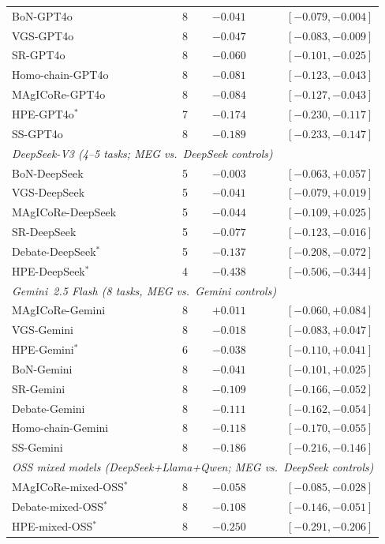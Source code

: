 \documentclass{article}
\begin{document}
\begin{table}[h]
\begin{tabular}{l r r r}
BoN-GPT4o & 8 & $-0.041$ & $[-0.079, -0.004]$ \\
VGS-GPT4o & 8 & $-0.047$ & $[-0.083, -0.009]$ \\
SR-GPT4o & 8 & $-0.060$ & $[-0.101, -0.025]$ \\
Homo-chain-GPT4o & 8 & $-0.081$ & $[-0.123, -0.043]$ \\
MAgICoRe-GPT4o & 8 & $-0.084$ & $[-0.127, -0.043]$ \\
HPE-GPT4o$^*$ & 7 & $-0.174$ & $[-0.230, -0.117]$ \\
SS-GPT4o & 8 & $-0.189$ & $[-0.233, -0.147]$ \\
\midrule
\multicolumn{4}{l}{\textit{DeepSeek-V3 (4--5 tasks; MEG vs.\ DeepSeek controls)}} \\
BoN-DeepSeek & 5 & $-0.003$ & $[-0.063, +0.057]$ \\
VGS-DeepSeek & 5 & $-0.041$ & $[-0.079, +0.019]$ \\
MAgICoRe-DeepSeek & 5 & $-0.044$ & $[-0.109, +0.025]$ \\
SR-DeepSeek & 5 & $-0.077$ & $[-0.123, -0.016]$ \\
Debate-DeepSeek$^*$ & 5 & $-0.137$ & $[-0.208, -0.072]$ \\
HPE-DeepSeek$^*$ & 4 & $-0.438$ & $[-0.506, -0.344]$ \\
\midrule
\multicolumn{4}{l}{\textit{Gemini~2.5 Flash (8 tasks, MEG vs.\ Gemini controls)}} \\
MAgICoRe-Gemini & 8 & $+0.011$ & $[-0.060, +0.084]$ \\
VGS-Gemini & 8 & $-0.018$ & $[-0.083, +0.047]$ \\
HPE-Gemini$^*$ & 6 & $-0.038$ & $[-0.110, +0.041]$ \\
BoN-Gemini & 8 & $-0.041$ & $[-0.101, +0.025]$ \\
SR-Gemini & 8 & $-0.109$ & $[-0.166, -0.052]$ \\
Debate-Gemini & 8 & $-0.111$ & $[-0.162, -0.054]$ \\
Homo-chain-Gemini & 8 & $-0.118$ & $[-0.170, -0.055]$ \\
SS-Gemini & 8 & $-0.186$ & $[-0.216, -0.146]$ \\
\midrule
\multicolumn{4}{l}{\textit{OSS mixed models (DeepSeek+Llama+Qwen; MEG vs.\ DeepSeek controls)}} \\
MAgICoRe-mixed-OSS$^*$ & 8 & $-0.058$ & $[-0.085, -0.028]$ \\
Debate-mixed-OSS$^*$ & 8 & $-0.108$ & $[-0.146, -0.051]$ \\
HPE-mixed-OSS$^*$ & 8 & $-0.250$ & $[-0.291, -0.206]$ \\
\bottomrule
\end{tabular}
\end{table}
\end{document}
